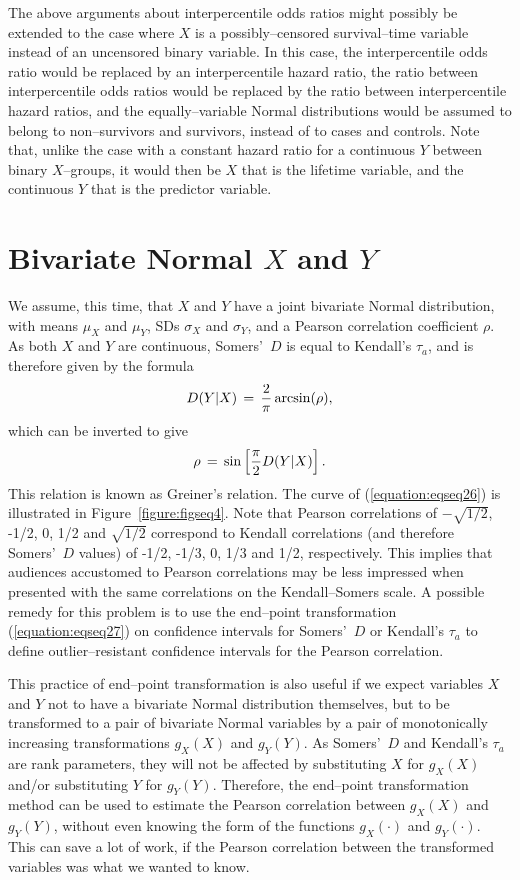 \documentclass[a4paper,notitlepage]{article}      %
\begin{document}
The above arguments about interpercentile odds ratios might possibly be extended
to the case where $X$ is a possibly--censored survival--time variable instead of an uncensored binary variable.
In this case, the interpercentile odds ratio would be replaced by  an interpercentile hazard ratio,
the ratio between interpercentile odds ratios would be replaced by the ratio between interpercentile hazard ratios,
and the equally--variable Normal distributions would be assumed to belong to non--survivors and survivors,
instead of to cases and controls.
Note that, unlike the case with a constant hazard ratio for a continuous $Y$ between binary $X$--groups,
it would then be $X$ that is the lifetime variable,
and the continuous $Y$ that is the predictor variable.

\section{Bivariate Normal $X$ and $Y$}

We assume, this time, that $X$ and $Y$ have a joint bivariate Normal distribution,
with means $\mu_X$ and $\mu_Y$,
SDs $\sigma_X$ and $\sigma_Y$, and a Pearson correlation coefficient $\rho$.
As both $X$ and $Y$ are continuous, Somers'~$D$ is equal to Kendall's $\tau_a$,
and is therefore given by the formula
\begin{equation}
D(Y|X) \, = \, {2\over \pi} \arcsin(\rho),
\label{equation:eqseq26}
\end{equation}
which can be inverted to give
\begin{equation}
\rho \, = \, \sin\left[ {\pi\over 2} D(Y|X) \right].
\label{equation:eqseq27}
\end{equation}
This relation is known as Greiner's relation.
The curve of (\ref{equation:eqseq26}) is illustrated in Figure~\ref{figure:figseq4}.
Note that Pearson correlations of $-\sqrt{1/2}$, -1/2, 0, 1/2 and $\sqrt{1/2}$
correspond to Kendall correlations (and therefore Somers'~$D$ values)
of -1/2, -1/3, 0, 1/3 and 1/2, respectively.
This implies that audiences accustomed to Pearson correlations may be less impressed
when presented with the same correlations on the Kendall--Somers scale.
A possible remedy for this problem is to use the end--point transformation (\ref{equation:eqseq27})
on confidence intervals for Somers'~$D$ or Kendall's $\tau_a$
to define outlier--resistant confidence intervals for the Pearson correlation.

This practice of end--point transformation is also useful if we expect variables $X$ and $Y$ not to have a bivariate Normal distribution themselves,
but to be transformed to a pair of bivariate Normal variables
by a pair of monotonically increasing transformations $g_X(X)$ and $g_Y(Y)$.
As Somers'~$D$ and Kendall's $\tau_a$ are rank parameters,
they will not be affected by substituting $X$ for $g_X(X)$ and/or substituting $Y$ for $g_Y(Y)$.
Therefore, the end--point transformation method can be used to estimate the Pearson correlation
between $g_X(X)$ and $g_Y(Y)$,
without even knowing the form of the functions $g_X(\cdot)$ and $g_Y(\cdot)$.
This can save a lot of work, if the Pearson correlation between the transformed variables was what we wanted to know.
\end{document}
